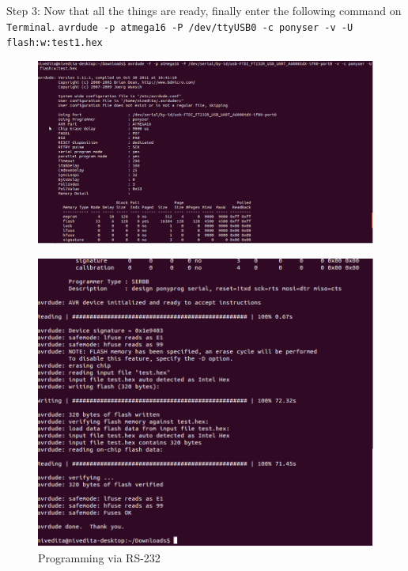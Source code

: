 \documentclass[12pt]{article}
\begin{document}
\vspace{12pt}
Step 3: Now that all the things are ready, finally enter the following command on \texttt{Terminal}.\singlespace
\vspace{12pt}
\texttt{avrdude -p atmega16 -P /dev/ttyUSB0	-c ponyser -v -U flash:w:test1.hex}\linebreak\singlespace
\vspace{12pt}
\begin{figure}[h!]
\includegraphics[scale=0.4]{RS1.png}
\end{figure}
\vspace{12pt}
\begin{figure}[h!]
\includegraphics[scale=0.5]{RS2.png}
\caption{Programming via RS-232}
\end{figure}
\vspace{12pt}
\end{document}
